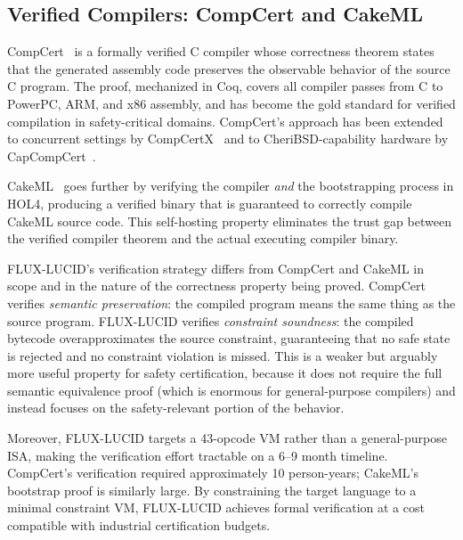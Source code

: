 \documentclass[sigplan,review,anonymous]{acmart}
\begin{document}
\subsection{Verified Compilers: CompCert and CakeML}
\label{sec:related-compilers}

CompCert~\cite{leroy2009compcert} is a formally verified C compiler whose
correctness theorem states that the generated assembly code preserves the
observable behavior of the source C program. The proof, mechanized in Coq,
covers all compiler passes from C to PowerPC, ARM, and x86 assembly, and
has become the gold standard for verified compilation in safety-critical
domains. CompCert's approach has been extended to concurrent settings by
CompCertX~\cite{song2019compcertx} and to CheriBSD-capability hardware by
CapCompCert~\cite{sammler2023capcompcert}.

CakeML~\cite{kumar2014cakeml} goes further by verifying the compiler
\emph{and} the bootstrapping process in HOL4, producing a verified binary
that is guaranteed to correctly compile CakeML source code. This
self-hosting property eliminates the trust gap between the verified
compiler theorem and the actual executing compiler binary.

FLUX-LUCID's verification strategy differs from CompCert and CakeML in
scope and in the nature of the correctness property being proved.
CompCert verifies \emph{semantic preservation}: the compiled program means
the same thing as the source program. FLUX-LUCID verifies \emph{constraint
soundness}: the compiled bytecode overapproximates the source constraint,
guaranteeing that no safe state is rejected and no constraint violation is
missed. This is a weaker but arguably more useful property for safety
certification, because it does not require the full semantic equivalence
proof (which is enormous for general-purpose compilers) and instead focuses
on the safety-relevant portion of the behavior.

Moreover, FLUX-LUCID targets a 43-opcode VM rather than a general-purpose
ISA, making the verification effort tractable on a 6--9 month timeline.
CompCert's verification required approximately 10 person-years; CakeML's
bootstrap proof is similarly large. By constraining the target language to a
minimal constraint VM, FLUX-LUCID achieves formal verification at a cost
compatible with industrial certification budgets.

\end{document}
